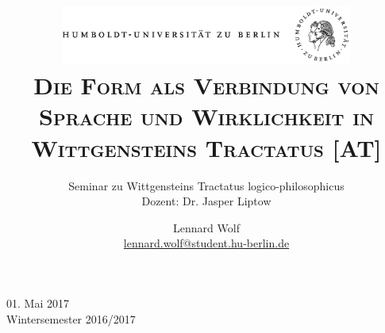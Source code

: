 \documentclass[a4paper, emulatestandardclasses, 12pt]{scrartcl}
\date{\vspace{-3ex}}
\begin{document}
\title{\vspace{5ex}
	\includegraphics*[width=0.72\textwidth]{ErstesSem/images/hu_logo.png}\\
	\vspace{30pt}
	\scshape\LARGE{Die Form als Verbindung von Sprache und Wirklichkeit in Wittgensteins Tractatus [AT]}}
	
	\subtitle{\vspace{20pt}Seminar zu Wittgensteins Tractatus logico-philosophicus\\
	\vspace{6pt}
          Dozent: Dr. Jasper Liptow}


\author{\vspace{-4pt}Lennard Wolf\\
        \small{\href{mailto:lennard.wolf@student.hu-berlin.de}{lennard.wolf@student.hu-berlin.de}}}      

\maketitle

\vspace{\fill}

\begin{minipage}[b]{\textwidth}
    \centering
    \onehalfspacing
    \large   
    01. Mai 2017\\
    Wintersemester 2016/2017

    \vspace{-20mm} 
\end{minipage}%
\thispagestyle{empty}
\newpage
\setcounter{page}{1}
\end{document}
